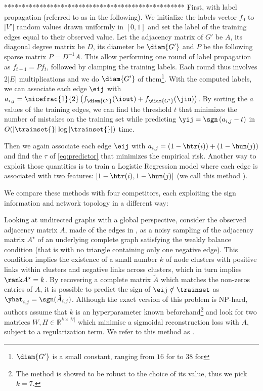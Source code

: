 \iffalse
***************************************************
First, with label propagation (referred to as \uslprop{} in the following). We
initialize the labels vector $f_0$ to $|V'|$ random values drawn uniformly in
$[0, 1]$ and set the label of the training edges equal to their observed value.
Let the adjacency matrix of $G'$ be $A$, its diagonal degree matrix
be $D$, its diameter be $\diam{G'}$ and $P$ be the following sparse matrix $P=D^{-1}A$. This allow performing
one round of label propagation as $f_{t+1} = Pf_t$, followed by clamping the
training labels. Each round thus involves $2|E|$ multiplications and we do
$\diam{G'}$ of them\footnote{$\diam{G'}$ is a small constant, ranging from $16$
for \aut{} to $38$ for \epi{}}. With the computed labels, we can associate each
edge $\eij$ with $a_{i,j} = \nicefrac{1}{2}\left(f_{\diam{G'}}(\iout) +
f_{\diam{G'}}(\jin)\right)$.
By sorting the $a$ values of the training edges, we can find the threshold $t$
that minimizes the number of mistakes on the training set while predicting
$\yij = \sgn\left(a_{i,j} - t\right)$ in $O(|\trainset{}|\log |\trainset{}|)$
time.

Then we again associate each
edge $\eij$ with $a_{i,j} = \left(1-\htr(i)\right) + \left(1-\hun(j)\right)$
and find the $\tau$ of \eqref{eq:predictor} that minimizes the empirical risk.
Another way to exploit those quantities is to
train a Logistic Regression model where each edge is associated with two
features: $[1-\htr(i), 1-\hun(j)]$ (we call this method \uslogregp{}).

We compare these methods with four competitors, each exploiting the sign
information and network topology in a different way:

Looking at undirected graphs with a global perspective,
\citet{LowRankCompletion14} consider the observed adjacency matrix $A$, made of
the edges in \trainset{}, as a noisy sampling of the adjacency matrix
$A^\star$ of an underlying complete graph satisfying the weakly balance
condition (that is with no triangle containing only one negative edge).
This condition implies the existence of a small number $k$ of node clusters
with positive links within clusters and negative links across clusters, which
in turn implies $\rank A^\star=k$.
By recovering a complete matrix $\tilde{A}$ which matches the non-zeros entries
of $A$, it is possible to predict the sign of $\eij \notin \trainset$
as $\yhat_{i,j} = \sgn(\tilde{A}_{i,j})$. Although the exact version of this
problem is NP-hard, authors assume that $k$ is an hyperparameter known
beforehand\footnote{The method is showed to be robust to the choice of its
value, thus we pick $k=7$.} and look for two matrices $W,H\in
\mathbb{R}^{k\times|V|}$ which minimise a sigmoidal reconstruction loss with
$A$, subject to a regularization term. We refer to this method as
\emph{\complowrank{}}.

